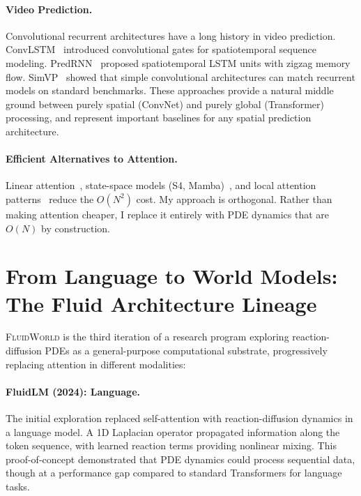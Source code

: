 \documentclass{article}
\newcommand{\fluidworld}{\textsc{FluidWorld}}
\begin{document}
\paragraph{Video Prediction.}
Convolutional recurrent architectures have a long history in video prediction. ConvLSTM~\cite{shi2015convlstm} introduced convolutional gates for spatiotemporal sequence modeling. PredRNN~\cite{wang2017predrnn,wang2022predrnnv2} proposed spatiotemporal LSTM units with zigzag memory flow. SimVP~\cite{gao2022simvp} showed that simple convolutional architectures can match recurrent models on standard benchmarks. These approaches provide a natural middle ground between purely spatial (ConvNet) and purely global (Transformer) processing, and represent important baselines for any spatial prediction architecture.

\paragraph{Efficient Alternatives to Attention.}
Linear attention~\cite{katharopoulos2020linear}, state-space models (S4, Mamba)~\cite{gu2022s4,gu2024mamba}, and local attention patterns~\cite{liu2021swin} reduce the $O(N^2)$ cost. My approach is orthogonal. Rather than making attention cheaper, I replace it entirely with PDE dynamics that are $O(N)$ by construction.

\section{From Language to World Models: The Fluid Architecture Lineage}
\label{sec:lineage}

\fluidworld{} is the third iteration of a research program exploring reaction-diffusion PDEs as a general-purpose computational substrate, progressively replacing attention in different modalities:

\paragraph{FluidLM (2024): Language.} The initial exploration replaced self-attention with reaction-diffusion dynamics in a language model. A 1D Laplacian operator propagated information along the token sequence, with learned reaction terms providing nonlinear mixing. This proof-of-concept demonstrated that PDE dynamics could process sequential data, though at a performance gap compared to standard Transformers for language tasks.
\end{document}
